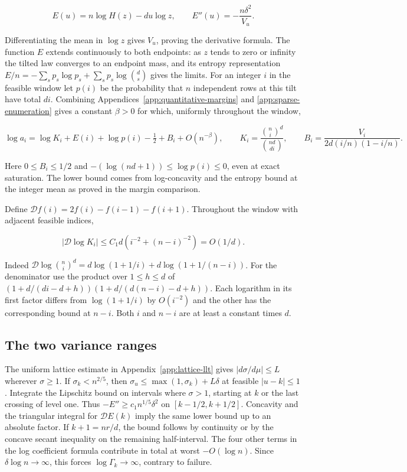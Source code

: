 \[
E(u)=n\log H(z)-du\log z,\qquad
E''(u)=-\frac{n\delta^2}{V_u}.
\]

Differentiating the mean in $\log z$ gives $V_u$, proving the derivative formula. The function $E$ extends continuously to both endpoints: as $z$ tends to zero or infinity the tilted law converges to an endpoint mass, and its entropy representation $E/n=-\sum_s p_s\log p_s+\sum_s p_s\log\binom ds$ gives the limits. For an integer $i$ in the feasible window let $p(i)$ be the probability that $n$ independent rows at this tilt have total $di$. Combining Appendices~\ref{app:quantitative-margins} and \ref{app:sparse-enumeration} gives a constant $\beta>0$ for which, uniformly throughout the window,

\[
\log a_i=\log K_i+E(i)+\log p(i)-\tfrac12+B_i+O(n^{-\beta}),\qquad
K_i=\frac{\binom ni^d}{\binom{nd}{di}},\qquad
B_i=\frac{V_i}{2d(i/n)(1-i/n)}.
\]

Here $0\le B_i\le1/2$ and $-(\log(nd+1))\le\log p(i)\le0$, even at exact saturation. The lower bound comes from log-concavity and the entropy bound at the integer mean as proved in the margin comparison.

Define $\mathcal D f(i)=2f(i)-f(i-1)-f(i+1)$. Throughout the window with adjacent feasible indices,

\[
|\mathcal D\log K_i|\le C_1d\left(i^{-2}+(n-i)^{-2}\right)=O(1/d).
\]

Indeed $\mathcal D\log\binom ni^d=d\log(1+1/i)+d\log(1+1/(n-i))$. For the denominator use the product over $1\le h\le d$ of $(1+d/(di-d+h))(1+d/(d(n-i)-d+h))$. Each logarithm in its first factor differs from $\log(1+1/i)$ by $O(i^{-2})$ and the other has the corresponding bound at $n-i$. Both $i$ and $n-i$ are at least a constant times $d$.

\subsection{The two variance ranges}

The uniform lattice estimate in Appendix~\ref{app:lattice-llt} gives $|d\sigma/d\mu|\le L$ wherever $\sigma\ge1$. If $\sigma_k<n^{2/5}$, then $\sigma_u\le\max(1,\sigma_k)+L\delta$ at feasible $|u-k|\le1$. Integrate the Lipschitz bound on intervals where $\sigma>1$, starting at $k$ or the last crossing of level one. Thus $-E''\ge c_1 n^{1/5}\delta^2$ on $[k-1/2,k+1/2]$. Concavity and the triangular integral for $\mathcal D E(k)$ imply the same lower bound up to an absolute factor. If $k+1=nr/d$, the bound follows by continuity or by the concave secant inequality on the remaining half-interval. The four other terms in the log coefficient formula contribute in total at worst $-O(\log n)$. Since $\delta\log n\to\infty$, this forces $\log\Gamma_k\to\infty$, contrary to failure.

